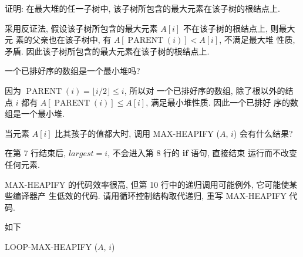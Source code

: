 \documentclass[boxes]{homework}
\begin{document}
\begin{problem}
证明: 在最大堆的任一子树中, 该子树所包含的最大元素在该子树的根结点上.
\end{problem}
\begin{solution}
    采用反证法, 假设该子树所包含的最大元素 $A[i]$ 不在该子树的根结点上, 则最大元
    素的父亲也在该子树中, 有 $A[\operatorname{PARENT}(i)] < A[i]$, 不满足最大堆
    性质, 矛盾. 因此该子树所包含的最大元素在该子树的根结点上.
\end{solution}

\begin{problem}
一个已排好序的数组是一个最小堆吗?
\end{problem}
\begin{solution}
    因为 $\operatorname{PARENT}(i) = \lfloor i / 2 \rfloor \leqslant i$, 所以对
    一个已排好序的数组, 除了根以外的结点 $i$ 都有
    $A[\operatorname{PARENT}(i)] \leqslant A[i]$, 满足最小堆性质. 因此一个已排好
    序的数组是一个最小堆.
\end{solution}

\begin{problem}
当元素 $A[i]$ 比其孩子的值都大时, 调用 MAX-HEAPIFY ($A$, $i$) 会有什么结果?
\end{problem}
\begin{solution}
    在第 7 行结束后, $largest = i$, 不会进入第 8 行的 \textbf{if} 语句, 直接结束
    运行而不改变任何元素.
\end{solution}

\begin{problem}
MAX-HEAPIFY 的代码效率很高, 但第 10 行中的递归调用可能例外, 它可能使某些编译器产
生低效的代码. 请用循环控制结构取代递归, 重写 MAX-HEAPIFY 代码.
\end{problem}
\begin{solution}
    如下
    \begin{algo}
        \caption{LOOP-MAX-HEAPIFY ($A$, $i$)}
        \label{algo:1}
    \end{algo}
\end{solution}
\end{document}
